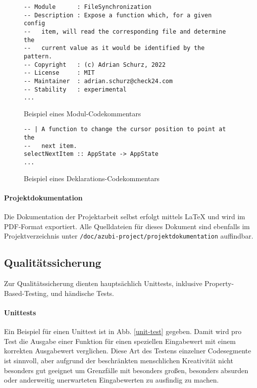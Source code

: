 \begin{figure}
    \caption{Beispiel eines Modul-Codekommentars}
    \label{codecomment-module}
    \begin{verbatim}
-- Module      : FileSynchronization
-- Description : Expose a function which, for a given config
--   item, will read the corresponding file and determine the
--   current value as it would be identified by the pattern.
-- Copyright   : (c) Adrian Schurz, 2022
-- License     : MIT
-- Maintainer  : adrian.schurz@check24.com
-- Stability   : experimental
...
    \end{verbatim}
\end{figure}

\begin{figure}
    \caption{Beispiel eines Deklarations-Codekommentars}
    \label{codecomment-declaration}
    \begin{verbatim}
-- | A function to change the cursor position to point at the
--   next item.
selectNextItem :: AppState -> AppState
...
    \end{verbatim}
\end{figure}

\paragraph{Projektdokumentation}
Die Dokumentation der Projektarbeit selbst erfolgt mittels \LaTeX \cite{latex} und
wird im \gls{PDF}-Format exportiert. Alle Quelldateien für dieses Dokument sind
ebenfalls im Projektverzeichnis unter \texttt{/doc/azubi-project/projektdokumentation}
auffindbar.

\subsection{Qualitätssicherung}
Zur Qualitätssicherung dienten hauptsächlich Unittests, inklusive \gls{Property-Based-Testing},
und händische Tests.

\paragraph{Unittests}
Ein Beispiel für einen Unittest ist in Abb. \ref{unit-test} gegeben. Damit wird
pro Test die Ausgabe einer Funktion für einen speziellen Eingabewert mit einem
korrekten Ausgabewert verglichen. Diese Art des Testens einzelner Codesegmente ist
sinnvoll, aber aufgrund der beschränkten menschlichen Kreativität nicht besonders
gut geeignet um Grenzfälle mit besonders großen, besonders absurden oder anderweitig
unerwarteten Eingabewerten zu ausfindig zu machen.


